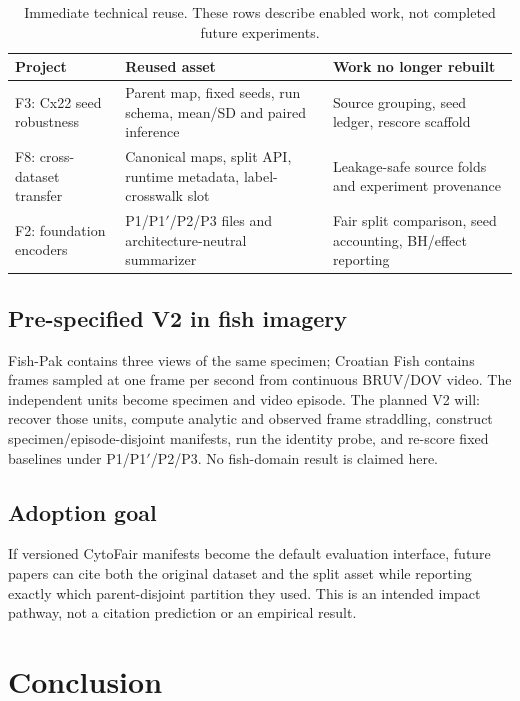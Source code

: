 \documentclass[11pt,oneside]{report}
\newcommand{\protocol}[1]{\textsf{#1}}
\begin{document}
\begin{table}[H]
\centering
\caption{Immediate technical reuse. These rows describe enabled work, not completed future experiments.}
\label{tab:reuse}
\begin{tabularx}{\textwidth}{lXX}
\toprule
Project & Reused asset & Work no longer rebuilt \\
\midrule
F3: Cx22 seed robustness & Parent map, fixed seeds, run schema, mean/SD and paired inference & Source grouping, seed ledger, rescore scaffold \\
F8: cross-dataset transfer & Canonical maps, split API, runtime metadata, label-crosswalk slot & Leakage-safe source folds and experiment provenance \\
F2: foundation encoders & P1/P1$'$/P2/P3 files and architecture-neutral summarizer & Fair split comparison, seed accounting, BH/effect reporting \\
\bottomrule
\end{tabularx}
\end{table}

\section{Pre-specified V2 in fish imagery}

Fish-Pak contains three views of the same specimen; Croatian Fish contains frames sampled at one frame per second from continuous BRUV/DOV video. The independent units become specimen and video episode. The planned V2 will: recover those units, compute analytic and observed frame straddling, construct specimen/episode-disjoint manifests, run the identity probe, and re-score fixed baselines under \protocol{P1}/\protocol{P1$'$}/\protocol{P2}/\protocol{P3}. No fish-domain result is claimed here.

\section{Adoption goal}

If versioned CytoFair manifests become the default evaluation interface, future papers can cite both the original dataset and the split asset while reporting exactly which parent-disjoint partition they used. This is an intended impact pathway, not a citation prediction or an empirical result.

\chapter{Conclusion}
\end{document}
